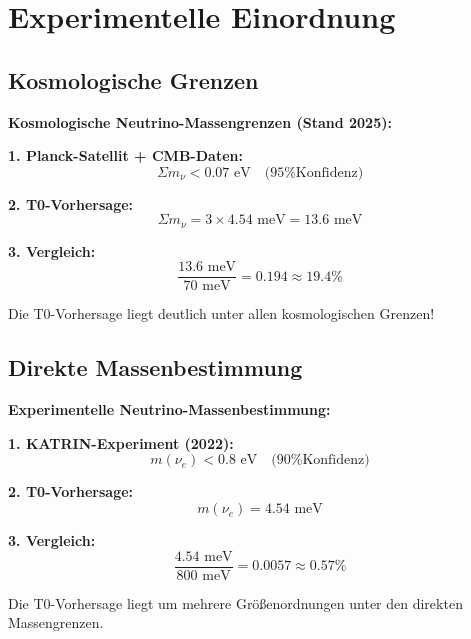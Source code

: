 \documentclass[12pt,a4paper]{article}
\begin{document}
	\section{Experimentelle Einordnung}
	
	\subsection{Kosmologische Grenzen}
	
	\begin{experimental}
		\textbf{Kosmologische Neutrino-Massengrenzen (Stand 2025):}
		
		\textbf{1. Planck-Satellit + CMB-Daten:}
		\begin{equation}
			\Sigma m_\nu < 0.07 \text{ eV} \quad \text{(95\% Konfidenz)}
		\end{equation}
		
		\textbf{2. T0-Vorhersage:}
		\begin{equation}
			\Sigma m_\nu = 3 \times 4.54 \text{ meV} = 13.6 \text{ meV}
		\end{equation}
		
		\textbf{3. Vergleich:}
		\begin{equation}
			\frac{13.6 \text{ meV}}{70 \text{ meV}} = 0.194 \approx 19.4\%
		\end{equation}
		
		Die T0-Vorhersage liegt deutlich unter allen kosmologischen Grenzen!
	\end{experimental}
	
	\subsection{Direkte Massenbestimmung}
	
	\begin{experimental}
		\textbf{Experimentelle Neutrino-Massenbestimmung:}
		
		\textbf{1. KATRIN-Experiment (2022):}
		\begin{equation}
			m(\nu_e) < 0.8 \text{ eV} \quad \text{(90\% Konfidenz)}
		\end{equation}
		
		\textbf{2. T0-Vorhersage:}
		\begin{equation}
			m(\nu_e) = 4.54 \text{ meV}
		\end{equation}
		
		\textbf{3. Vergleich:}
		\begin{equation}
			\frac{4.54 \text{ meV}}{800 \text{ meV}} = 0.0057 \approx 0.57\%
		\end{equation}
		
		Die T0-Vorhersage liegt um mehrere Größenordnungen unter den direkten Massengrenzen.
	\end{experimental}
	
\end{document}
